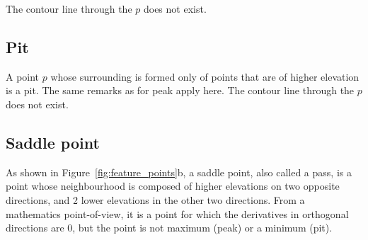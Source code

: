 The contour line through the $p$ does not exist.

\subsection{Pit}
A point $p$ whose surrounding is formed only of points that are of higher elevation is a pit.
The same remarks as for peak apply here.
The contour line through the $p$ does not exist.

\subsection{Saddle point}%

As shown in Figure~\ref{fig:feature_points}b, a saddle point, also called a pass, is a point whose neighbourhood is composed of higher elevations on two opposite directions, and 2 lower elevations in the other two directions.
From a mathematics point-of-view, it is a point for which the derivatives in orthogonal directions are 0, but the point is not maximum (peak) or a minimum (pit).

%

